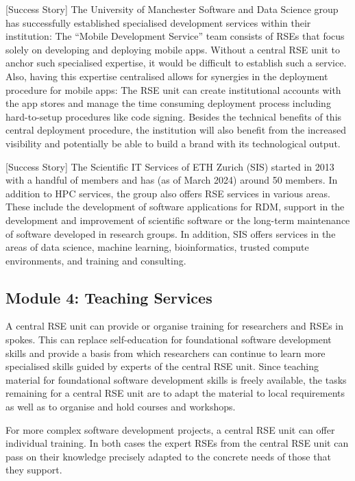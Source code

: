 \documentclass[a4paper]{article}
\begin{document}
[Success Story]
The University of Manchester Software and Data Science group has successfully established specialised development services within their institution:
The “Mobile Development Service” \autocite{manchester_mobile} team consists of RSEs that focus solely on developing and deploying mobile apps.
Without a central RSE unit to anchor such specialised expertise, it would be difficult to establish such a service.
Also, having this expertise centralised allows for synergies in the deployment procedure for mobile apps:
The RSE unit can create institutional accounts with the app stores and manage the time consuming deployment process including hard-to-setup procedures like code signing.
Besides the technical benefits of this central deployment procedure, the institution will also benefit from the increased visibility and potentially be able to build a brand with its technological output.

[Success Story]
The Scientific IT Services of ETH Zurich (SIS) started in 2013 with a handful of members and has (as of March 2024) around 50 members.
In addition to HPC services, the group also offers RSE services in various areas.
These include the development of software applications for RDM, support in the development and improvement of scientific software or the long-term maintenance of software developed in research groups.
In addition, SIS offers services in the areas of data science, machine learning, bioinformatics, trusted compute environments, and training and consulting.

\subsection{Module 4: Teaching Services}%
\label{sec:teaching}

A central RSE unit can provide or organise training for researchers and RSEs in spokes.
This can replace self-education for foundational software development skills and provide a basis from which researchers can continue to learn more specialised skills guided by experts of the central RSE unit.
Since teaching material for foundational software development skills is freely available,
the tasks remaining for a central RSE unit are to adapt the material to local requirements as well as to organise and hold courses and workshops.

For more complex software development projects, a central RSE unit can offer individual training.
In both cases the expert RSEs from the central RSE unit can pass on their knowledge precisely adapted to the concrete needs of those that they support.
\end{document}
